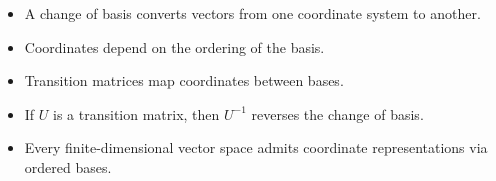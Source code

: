 \documentclass[12pt,a4paper]{article}
\begin{document}
	\begin{tcolorbox}[colback=shadeyellow, colframe=orange!70!black, title=Summary, breakable]
		\begin{itemize}
			\item A change of basis converts vectors from one coordinate system to another.
			\item Coordinates depend on the ordering of the basis.
			\item Transition matrices map coordinates between bases.
			\item If $U$ is a transition matrix, then $U^{-1}$ reverses the change of basis.
			\item Every finite-dimensional vector space admits coordinate representations via ordered bases.
		\end{itemize}
	\end{tcolorbox}
	
\end{document}
